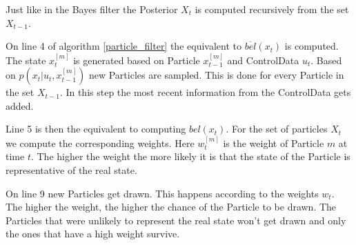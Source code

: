 Just like in the Bayes filter the \gls{Posterior} $X_t$ is computed recursively from the set $X_{t-1}$. 

On line 4 of algorithm \ref{particle_filter} the equivalent to $\overline{bel}(x_t)$ is computed. The state $x_t^{[m]}$ is generated based on \gls{Particle} $x_{t-1}^{[m]}$ and \gls{ControlData} $u_t$. Based on $p(x_t|u_t,x_{t-1}^{[m]})$ new \gls{Particle}s are sampled. This is done for every \gls{Particle} in the set $X_{t-1}$. In this step the most recent information from the \gls{ControlData} gets added.

Line 5 is then the equivalent to computing $bel(x_t)$. For the set of particles $X_t$ we compute the corresponding weights. Here $w_t^{[m]}$ is the weight of \gls{Particle} $m$ at time $t$. The higher the weight the more likely it is that the state of the \gls{Particle} is representative of the real state. 

On line 9 new \gls{Particle}s get drawn. This happens according to the weights $w_t$. The higher the weight, the higher the chance of the \gls{Particle} to be drawn. The \gls{Particle}s that were unlikely to represent the real state won't get drawn and only the ones that have a high weight survive.





